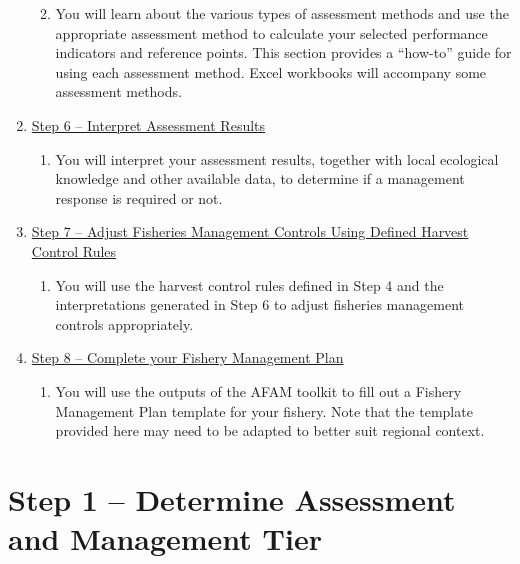 \documentclass[]{book}
\providecommand{\tightlist}{%
  \setlength{\itemsep}{0pt}\setlength{\parskip}{0pt}}
\begin{document}
\begin{enumerate}
  \begin{enumerate}
  \def\labelenumii{\alph{enumii}.}
  \tightlist
  \item
    You will learn about the various types of assessment methods and use
    the appropriate assessment method to calculate your selected
    performance indicators and reference points. This section provides a
    ``how-to'' guide for using each assessment method. Excel workbooks
    will accompany some assessment methods.
  \end{enumerate}
\item
  \protect\hyperlink{Step6}{Step 6 -- Interpret Assessment Results}

  \begin{enumerate}
  \def\labelenumii{\alph{enumii}.}
  \tightlist
  \item
    You will interpret your assessment results, together with local
    ecological knowledge and other available data, to determine if a
    management response is required or not.
  \end{enumerate}
\item
  \protect\hyperlink{Step7}{Step 7 -- Adjust Fisheries Management
  Controls Using Defined Harvest Control Rules}

  \begin{enumerate}
  \def\labelenumii{\alph{enumii}.}
  \tightlist
  \item
    You will use the harvest control rules defined in Step 4 and the
    interpretations generated in Step 6 to adjust fisheries management
    controls appropriately.
  \end{enumerate}
\item
  \protect\hyperlink{Step8}{Step 8 -- Complete your Fishery Management
  Plan}

  \begin{enumerate}
  \def\labelenumii{\alph{enumii}.}
  \tightlist
  \item
    You will use the outputs of the AFAM toolkit to fill out a Fishery
    Management Plan template for your fishery. Note that the template
    provided here may need to be adapted to better suit regional
    context.
  \end{enumerate}
\end{enumerate}

\hypertarget{Step1}{\chapter{Step 1 -- Determine Assessment and
Management Tier}\label{Step1}}
\end{document}
